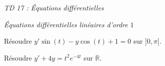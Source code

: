 \documentclass[a4paper,10pt]{report}
\begin{document}
\everymath{\displaystyle}

\begin{center}
\textit{{ {\huge TD 17 : Équations différentielles}}}
\end{center}


%


\medskip

\begin{center}
\textit{{ {\large Équations différentielles linéaires d'ordre $1$}}}
\end{center}

\medskip

\begin{Exa} Résoudre $y' \sin(t)-y \cos(t)+1=0$ sur $]0,\pi[$.
\end{Exa}


\begin{Exa} Résoudre $y'+4y = t^2 e^{-4t}$ sur $\mathbb{R}$. 
\end{Exa}

\end{document}
